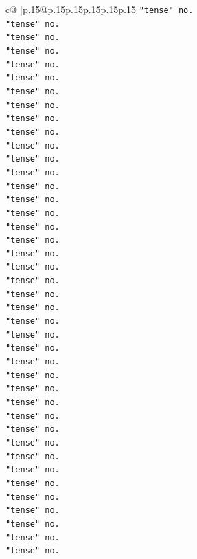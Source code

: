 \documentclass{article}
\begin{document}
{\begin{supertabular}{c@{$\;$}|p{.15\linewidth}@{}p{.15\linewidth}p{.15\linewidth}p{.15\linewidth}p{.15\linewidth}p{.15\linewidth}}
{{{\texttt{"tense" no.} \\
\texttt{"tense" no.} \\
\texttt{"tense" no.} \\
\texttt{"tense" no.} \\
\texttt{"tense" no.} \\
\texttt{"tense" no.} \\
\texttt{"tense" no.} \\
\texttt{"tense" no.} \\
\texttt{"tense" no.} \\
\texttt{"tense" no.} \\
\texttt{"tense" no.} \\
\texttt{"tense" no.} \\
\texttt{"tense" no.} \\
\texttt{"tense" no.} \\
\texttt{"tense" no.} \\
\texttt{"tense" no.} \\
\texttt{"tense" no.} \\
\texttt{"tense" no.} \\
\texttt{"tense" no.} \\
\texttt{"tense" no.} \\
\texttt{"tense" no.} \\
\texttt{"tense" no.} \\
\texttt{"tense" no.} \\
\texttt{"tense" no.} \\
\texttt{"tense" no.} \\
\texttt{"tense" no.} \\
\texttt{"tense" no.} \\
\texttt{"tense" no.} \\
\texttt{"tense" no.} \\
\texttt{"tense" no.} \\
\texttt{"tense" no.} \\
\texttt{"tense" no.} \\
\texttt{"tense" no.} \\
\texttt{"tense" no.} \\
\texttt{"tense" no.} \\
\texttt{"tense" no.} \\
\texttt{"tense" no.} \\
\texttt{"tense" no.} \\
\texttt{"tense" no.} \\
\texttt{"tense" no.} \\
\texttt{"tense" no.} \\
}}}
\end{supertabular}}
\end{document}
